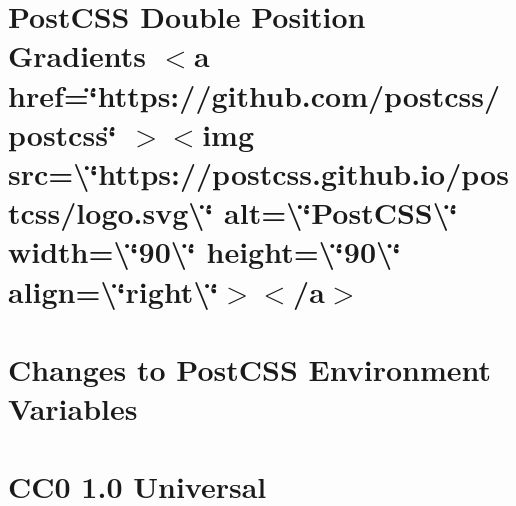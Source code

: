 \documentclass[twoside]{book}
\newcommand{\+}{\discretionary{\mbox{\scriptsize$\hookleftarrow$}}{}{}}
\begin{document}
\chapter{Post\+CSS Double Position Gradients \texorpdfstring{$<$}{<}a href=\char`\"{}https\+://github.\+com/postcss/postcss\char`\"{} \texorpdfstring{$>$}{>}\texorpdfstring{$<$}{<}img src=\textbackslash{}\char`\"{}https\+://postcss.\+github.\+io/postcss/logo.\+svg\textbackslash{}\char`\"{} alt=\textbackslash{}\char`\"{}\+Post\+CSS\textbackslash{}\char`\"{} width=\textbackslash{}\char`\"{}90\textbackslash{}\char`\"{} height=\textbackslash{}\char`\"{}90\textbackslash{}\char`\"{} align=\textbackslash{}\char`\"{}right\textbackslash{}\char`\"{}\texorpdfstring{$>$}{>}\texorpdfstring{$<$}{<}/a\texorpdfstring{$>$}{>}}
\label{md__c___users_vaishnavi_jadhav__desktop__developer_code_mean_stack_example_client_node_modules_p89d1e14b4ef4876d59fbaf276d587de7}

\chapter{Changes to Post\+CSS Environment Variables}
\label{md__c___users_vaishnavi_jadhav__desktop__developer_code_mean_stack_example_client_node_modules_p42b2a63e75c31be98ed943129b32309e}

\chapter{CC0 1.0 Universal}
\label{md__c___users_vaishnavi_jadhav__desktop__developer_code_mean_stack_example_client_node_modules_p258c8566699ca1115f569fa53d693a9d}

\end{document}
